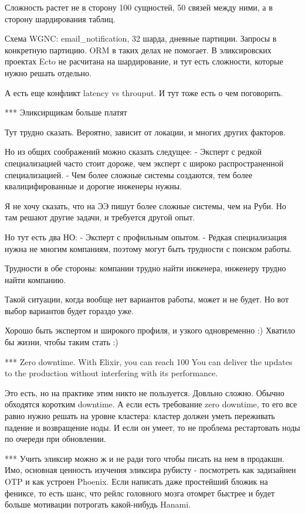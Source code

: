 \documentclass[10pt]{beamer}
\begin{document}
Сложность растет не в сторону 100 сущностей, 50 связей между ними, а в сторону шардирования таблиц.

Схема WGNC: email_notification, 32 шарда, дневные партиции. Запросы в конкретную партицию. ORM в таких делах не помогает.
В эликсировских проектах Ecto не расчитана на шардирование, и тут есть сложности, которые нужно решать отдельно.

А есть еще конфликт latency vs throuput. И тут тоже есть о чем поговорить.



*** Эликсирщикам больше платят

Тут трудно сказать. Вероятно, зависит от локации, и многих других факторов.

Но из общих соображений можно сказать следущее:
- Эксперт с редкой специализацией часто стоит дороже, чем эксперт с широко распространенной специализацией.
- Чем более сложные системы создаются, тем более квалицифированные и дорогие инженеры нужны.

Я не хочу сказать, что на ЭЭ пишут более сложные системы, чем на Руби. Но там решают другие задачи, и требуется другой опыт.

Но тут есть два НО:
- Эксперт с профильным опытом.
- Редкая специализация нужна не многим компаниям, поэтому могут быть трудности с поиском работы.

Трудности в обе стороны: компании трудно найти инженера, инженеру трудно найти компанию.

Такой ситуации, когда вообще нет вариантов работы, может и не будет. Но вот выбор вариантов будет гораздо уже.

Хорошо быть экспертом и широкого профиля, и узкого одновременно :) Хватило бы жизни, чтобы таким стать :)


*** Zero downtime. With Elixir, you can reach 100%
You can deliver the updates to the production without interfering with its performance.

Это есть, но на практике этим никто не пользуется. Довльно сложно. Обычно обходятся коротким downtime.
А если есть требование zero downtime, то его все равно нужно решать на уровне кластера: кластер должен уметь переживать падение и возвращение ноды.
И если он умеет, то не проблема рестартовать ноды по очереди при обновлении.


*** Учить эликсир можно ж и не ради того чтобы писать на нем в продакшн.
Имо, основная ценность изучения эликсира рубисту - посмотреть как задизайнен OTP и как устроен Phoenix.
Если написать даже простейший бложик на фениксе, то есть шанс, что рейлс головного мозга отомрет быстрее и будет больше мотивации потрогать какой-нибудь Hanami.
\end{document}
